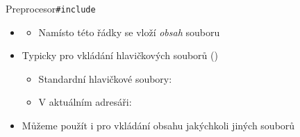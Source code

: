 \begin{frame}{Preprocesor}{\texttt{\#include}}

  \begin{itemize}
    \item {}
    \begin{itemize}
      \item Namísto této řádky se vloží \emph{obsah} souboru 
    \end{itemize}

    \pause

    \item Typicky pro vkládání hlavičkových souborů ()
    \begin{itemize}
      \item Standardní hlavičkové soubory: 
      \item V aktuálním adresáři: 
    \end{itemize}

    \pause

    \item Můžeme použít i pro vkládání obsahu jakýchkoli jiných souborů

  \end{itemize}

\end{frame}

